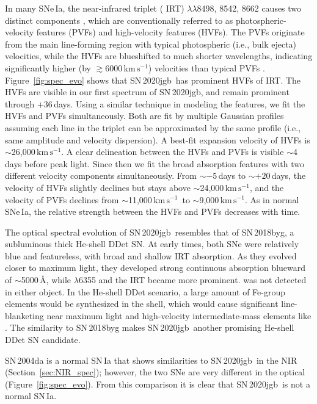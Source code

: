 \documentclass[twocolumn]{aastex631}
\newcommand{\sn}{SN\,2020jgb}
\newcommand{\kms}{$\mathrm{km}\,\mathrm{s}^{-1}$}
\begin{document}
\begin{CJK*}{UTF8}{gbsn}
In many SNe\,Ia, the  near-infrared triplet ( IRT) $\lambda\lambda$8498, 8542, 8662 causes two distinct components \citep{Mazzali_2005}, which are conventionally referred to as photospheric-velocity features (PVFs) and high-velocity features (HVFs). The PVFs originate from the main line-forming region with typical photospheric (i.e., bulk ejecta) velocities, while the HVFs are blueshifted to much shorter wavelengths, indicating significantly higher (by $\gtrsim$6000\,\kms) velocities than typical PVFs \citep{Silverman_HVF_2015}. Figure~\ref{fig:spec_evo} shows that \sn\ has prominent HVFs of  IRT. The HVFs are visible in our first spectrum of \sn, and remain prominent through $+36$\,days. Using a similar technique in modeling the  features, we fit the HVFs and PVFs simultaneously. Both are fit by multiple Gaussian profiles assuming each line in the triplet can be approximated by the same profile (i.e., same amplitude and velocity dispersion). A best-fit expansion velocity of HVFs is $\sim$26,000\,\kms. A clear delineation between the HVFs and PVFs is visible $\sim$4\,days before peak light. Since then we fit the broad absorption features with two different velocity components simultaneously. From $\sim$$-5$\,days to $\sim$$+20$\,days, the velocity of HVFs slightly declines but stays above $\sim$24,000\,\kms, and the velocity of PVFs declines from $\sim$11,000\,\kms\ to $\sim$9,000\,\kms. As in normal SNe\,Ia, the relative strength between the HVFs and PVFs decreases with time.

The optical spectral evolution of \sn\ resembles that of SN\,2018byg, a subluminous thick He-shell DDet SN. At early times, both SNe were relatively blue and featureless, with broad and shallow  IRT absorption. As they evolved closer to maximum light, they developed strong continuous absorption blueward of $\sim$5000\,\AA, while  $\lambda$6355 and the  IRT became more prominent.  was not detected in either object. In the He-shell DDet scenario, a large amount of Fe-group elements would be synthesized in the shell, which would cause significant line-blanketing near maximum light \citep{Kromer_DD_2010, polin_observational_2019} and high-velocity intermediate-mass elements like  \citep{Fink_DD_2010, Kromer_DD_2010,Shen_DD_2014}. The similarity to SN\,2018byg makes \sn\ another promising He-shell DDet SN candidate.

SN\,2004da is a normal SN\,Ia that shows similarities to \sn\ in the NIR (Section~\ref{sec:NIR_spec}); however, the two SNe are very different in the optical (Figure~\ref{fig:spec_evo}). From this comparison it is clear that \sn\ is not a normal SN\,Ia. 


\end{CJK*}
\end{document}
